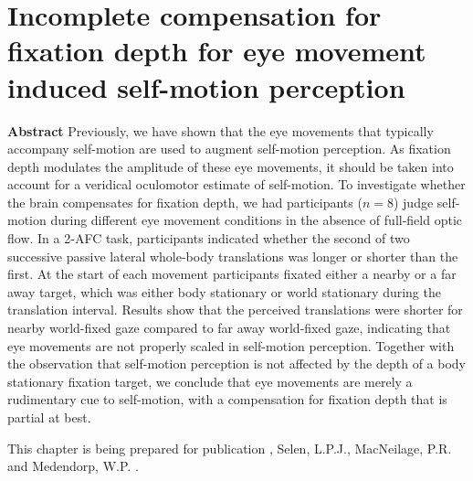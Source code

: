 
\thispagestyle{empty}


\chapter{Incomplete compensation for fixation depth for eye movement induced self-motion perception}
\chaptermark{}

\newpage

\small {\bf Abstract}
Previously, we have shown that the eye movements that typically accompany self-motion are used to augment self-motion perception. As fixation depth modulates the amplitude of these eye movements, it should be taken into account for a veridical oculomotor estimate of self-motion. To investigate whether the brain compensates for fixation depth, we had  participants ($n = 8$) judge self-motion during different eye movement conditions in the absence of full-field optic flow.  In a 2-AFC task, participants indicated whether the second of two successive passive lateral whole-body translations was longer or shorter than the first. At the start of each movement participants fixated either a nearby or a far away target, which was either body stationary or world stationary during the translation interval. Results show that the perceived translations were shorter for nearby world-fixed gaze compared to far away world-fixed gaze, indicating that eye movements are not properly scaled in self-motion perception. Together with the observation that self-motion perception is not affected by the depth of a body stationary fixation target, we conclude that eye movements are merely a rudimentary cue to self-motion, with a compensation for fixation depth that is partial at best.

\vfill

\noindent\underline{ \hspace{4cm} }

\noindent This chapter is being prepared for publication \newline
{}, Selen, L.P.J., MacNeilage, P.R. and Medendorp, W.P. \citeyear{clemens2015b}. %

\newpage







